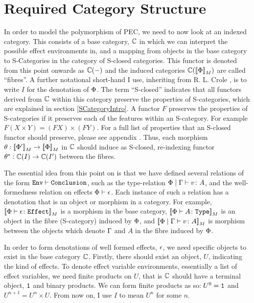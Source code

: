 \documentclass{Report}
\begin{document}
\section{Required Category Structure}
In order to model the polymorphism of PEC, we need to now look at an indexed category. This consists of a base category, $\C$ in which we can interpret the possible effect environments in, and a mapping from objects in the base category to S-Categories in the category of S-closed categories. This functor is denoted from this point onwards as $\C(-)$ and the induced categories $\C(\deno{\P})$ are called ``fibres''. A further notational short-hand I use, inheriting from R. L. Crole , is to write $I$ for the denotation of $\P$. The term ``S-closed'' indicates that all functors derived from $\C$ within this category preserve the properties of S-categories, which are explained in section \ref{SCategoryIntro}. A functor $F$ preserves the properties of S-categories if it preserves each of the features within an S-category. For example $F(X\times Y) = (FX)\times (FY)$. For a full list of properties that an S-closed functor should preserve, please see appendix . Thus, each morphism $\theta: \deno{\P'}\rightarrow\deno{\P}$ in $\C$ should induce as S-closed, re-indexing functor $\theta\star: \C(I)\rightarrow\C(I')$ between the fibres.

The essential idea from this point on is that we have defined several relations of the form $\wellformed{\texttt{Env}}{\texttt{Conclusion}}$, such as the type-relation $\gpetyperelation{v}{A}$, and the well-formedness relation on effects $\wellformed{\P}{\e}$. Each instance of such a relation has a denotation that is an object or morphism in a category. For example, $\deno{\typerelation{\P}{\e}{\effect}}$ is a morphism in the base category, $\deno{\typerelation{\P}{A}{\type}}$ is an object in the fibre (S-category) induced by $\P$, and $\deno{\gpetyperelation{v}{A}}$ is morphism between the objects which denote $\G$ and $A$ in the fibre induced by $\P$.

In order to form denotations of well formed effects, $\e$, we need specific objects to exist in the base category $\C$. Firstly, there should exist an object, $U$, indicating the kind of effects. To denote effect variable environments, essentially a list of effect variables, we need finite products on $U$, that is $\C$ should have a terminal object, $\1$ and binary products. We can form finite products as so: $U^0 = \1$ and $U^{n+1} = U^n\times U$. From now on, I use $I$ to mean $U^n$ for some $n$.
\end{document}
